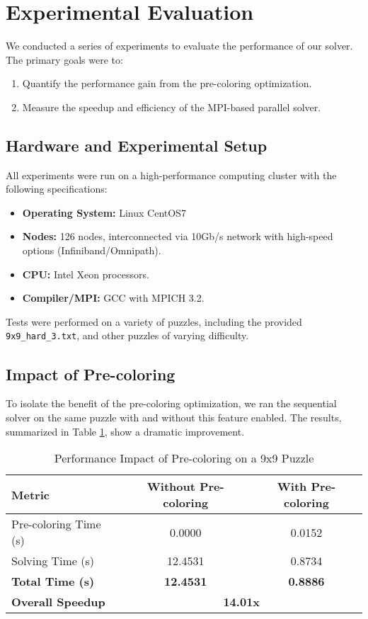 \section{Experimental Evaluation}
We conducted a series of experiments to evaluate the performance of our solver. The primary goals were to:
\begin{enumerate}
    \item Quantify the performance gain from the pre-coloring optimization.
    \item Measure the speedup and efficiency of the MPI-based parallel solver.
\end{enumerate}

\subsection{Hardware and Experimental Setup}
All experiments were run on a high-performance computing cluster with the following specifications:
\begin{itemize}
    \item \textbf{Operating System:} Linux CentOS7
    \item \textbf{Nodes:} 126 nodes, interconnected via 10Gb/s network with high-speed options (Infiniband/Omnipath).
    \item \textbf{CPU:} Intel Xeon processors.
    \item \textbf{Compiler/MPI:} GCC with MPICH 3.2.
\end{itemize}
Tests were performed on a variety of puzzles, including the provided \texttt{9x9\_hard\_3.txt}, and other puzzles of varying difficulty.

\subsection{Impact of Pre-coloring}
To isolate the benefit of the pre-coloring optimization, we ran the sequential solver on the same puzzle with and without this feature enabled. The results, summarized in Table \ref{tab:precolor_impact}, show a dramatic improvement.

\begin{table}[htbp]
\caption{Performance Impact of Pre-coloring on a 9x9 Puzzle}
\begin{center}
\begin{tabular}{@{}lcc@{}}
\toprule
\textbf{Metric} & \textbf{Without Pre-coloring} & \textbf{With Pre-coloring} \\
\midrule
Pre-coloring Time (s) & 0.0000 & 0.0152 \\
Solving Time (s)      & 12.4531 & 0.8734 \\
\textbf{Total Time (s)} & \textbf{12.4531} & \textbf{0.8886} \\
\midrule
\textbf{Overall Speedup} & \multicolumn{2}{c}{\textbf{14.01x}} \\
\bottomrule
\end{tabular}
\end{center}
\label{tab:precolor_impact}
\end{table}

